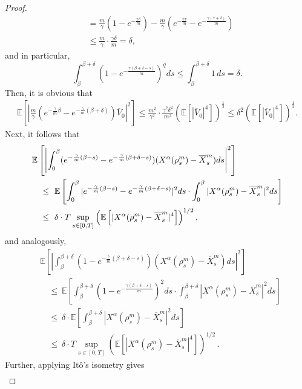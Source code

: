 \documentclass{ims9x6}
\newcommand{\nn}{\nonumber}
\newcommand{\EE}{\mathbb{E}}
\newcommand{\OV}{\overline{V}}
\newcommand{\OX}{\overline{X}}
\begin{document}
\begin{proof}
\begin{align*}
	&=
	\frac{m}{\gamma} \left( 1- e^{-\frac{\gamma \delta}{m}}  \right)
	-\frac{m}{\gamma} \left( e^{-\frac{\gamma \tau}{m}} -e^{-\frac{\gamma (\tau+\delta)}{m}} \right)
	\\
	& \leq  \frac{m}{\gamma} \cdot \frac{\gamma\delta}{m} 
	=\delta,
	\end{align*}
	and in particular, 
	$$
	\int_{\beta}^{\beta+\delta} \left(1-e^{-\frac{\gamma(\beta+\delta-s)}{m}}\right)^q ds \leq \int_{\beta}^{\beta+\delta} 1 \,ds =\delta.
	$$
	Then, it is obvious that
	{\small \begin{align*}
		\EE\left[\left|\frac{m}{\gamma}(e^{-\frac{\gamma}{m}\beta}-e^{-\frac{\gamma}{m}(\beta+\delta)})\OV_0\right|^2\right]
		\leq \frac{m^2}{\gamma^2}\cdot \frac{\gamma^2\delta^2}{m^2}
		\left(\EE[|\OV_0|^4]\right)^{\frac{1}{2}}
		\leq \delta^2\left(\EE[|\OV_0|^4]\right)^{\frac{1}{2}}.
		\end{align*}}
	Next, it follows that
	{\small \begin{align*}
		&\EE\left[\left| \int_0^\beta (e^{-\frac{\gamma}{m}(\beta-s)}-e^{-\frac{\gamma}{m}(\beta+\delta-s)}) (X^{\alpha}(\rho_s^m)-\OX_s^m)ds\right|^2\right]
		\notag\\
		&\quad \leq\   
		 \EE\left[\int_0^{\beta} |e^{-\frac{\gamma}{m}(\beta-s)}-e^{-\frac{\gamma}{m}(\beta+\delta-s)}|^2 ds\cdot \int_0^{\beta} |X^{\alpha}(\rho_s^m)-\OX_s^m|^2ds\right]\notag\\
		&\quad\leq \ 
		\delta \cdot T \sup_{s\in[0,T]}  \left(\EE\left[    |X^{\alpha}(\rho_s^m)-\OX_s^m|^4 \right] \right)^{1/2},
		\notag
		\end{align*}}
	and analogously,
	{\small \begin{align*}
		&\EE\left[\left| \int_\beta^{\beta+\delta} (1-e^{-\frac{\gamma}{m}(\beta+\delta-s)}) (X^{\alpha}(\rho_s^m)-\OX_s^m)ds \right|^2\right] \nn\\
		&\quad\leq \ 
		\EE\left[
		\int_{\beta}^{\beta+\delta} \left(1-e^{-\frac{\gamma(\beta+\delta-s)}{m}}\right)^2 ds
		\cdot \int_\beta^{\beta+\delta} |X^{\alpha}(\rho_s^m)-\OX_s^m|^2ds
		\right]
		\\
		&\quad\leq \    \delta\cdot
		\EE\left[\int_\beta^{\beta+\delta} |X^{\alpha}(\rho_s^m)-\OX_s^m|^2ds\right] \\
		 &\quad\leq \  \delta \cdot T \sup_{s\in[0,T]}  \left(\EE\left[    |X^{\alpha}(\rho_s^m)-\OX_s^m|^4 \right]\right)^{1/2}\,.
		\end{align*}}
	Further, applying It\^{o}'s isometry  gives
{\small 	\begin{align}

\end{align}}
\end{proof}
\end{document}
